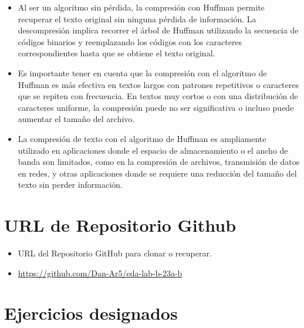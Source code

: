 \documentclass{article}
\begin{document}
\begin{itemize}
		\item Al ser un algoritmo sin pérdida, la compresión con Huffman permite recuperar el texto original sin ninguna pérdida de información. La descompresión implica recorrer el árbol de Huffman utilizando la secuencia de códigos binarios y reemplazando los códigos con los caracteres correspondientes hasta que se obtiene el texto original.
		
		\item Es importante tener en cuenta que la compresión con el algoritmo de Huffman es más efectiva en textos largos con patrones repetitivos o caracteres que se repiten con frecuencia. En textos muy cortos o con una distribución de caracteres uniforme, la compresión puede no ser significativa o incluso puede aumentar el tamaño del archivo.
		
		\item La compresión de texto con el algoritmo de Huffman es ampliamente utilizado en aplicaciones donde el espacio de almacenamiento o el ancho de banda son limitados, como en la compresión de archivos, transmisión de datos en redes, y otras aplicaciones donde se requiere una reducción del tamaño del texto sin perder información.

	\end{itemize}	
		

	\section{URL de Repositorio Github}
	\begin{itemize}
		\item URL del Repositorio GitHub para clonar o recuperar.
		\item \url{https://github.com/Dan-Ar5/eda-lab-b-23a-b}
	\end{itemize}
	
	\section{Ejercicios designados}
\end{document}

